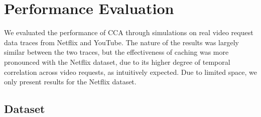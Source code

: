 \documentclass[conference]{IEEEtran}
\begin{document}
\section{Performance Evaluation}
\label{sec:ExperimentalEvaluation}
We evaluated the performance of CCA through simulations on real video request data traces from Netflix and YouTube. The nature of the results was largely similar between the two traces, but the effectiveness of caching was more pronounced with the Netflix dataset, due to its higher degree of temporal correlation across video requests, as intuitively expected. Due to limited space, we only present results for the Netflix dataset. 


\subsection{Dataset}


\end{document}
